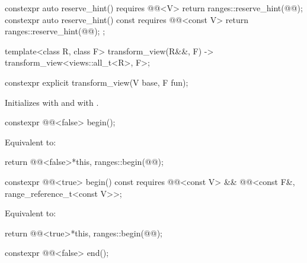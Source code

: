 \begin{codeblock}
{{    constexpr auto reserve_hint() requires @@<V>
    { return ranges::reserve_hint(@@); }
    constexpr auto reserve_hint() const requires @@<const V>
    { return ranges::reserve_hint(@@); }
  };

  template<class R, class F>
    transform_view(R&&, F) -> transform_view<views::all_t<R>, F>;
}
\end{codeblock}

%
\begin{itemdecl}
constexpr explicit transform_view(V base, F fun);
\end{itemdecl}

\begin{itemdescr}
\pnum
\effects
Initializes  with  and
 with .
\end{itemdescr}

%
\begin{itemdecl}
constexpr @@<false> begin();
\end{itemdecl}

\begin{itemdescr}
\pnum
\effects
Equivalent to:
\begin{codeblock}
return @@<false>{*this, ranges::begin(@@)};
\end{codeblock}
\end{itemdescr}

%
\begin{itemdecl}
constexpr @@<true> begin() const
  requires @@<const V> &&
           @@<const F&, range_reference_t<const V>>;
\end{itemdecl}

\begin{itemdescr}
\pnum
\effects
Equivalent to:
\begin{codeblock}
return @@<true>{*this, ranges::begin(@@)};
\end{codeblock}
\end{itemdescr}

%
\begin{itemdecl}
constexpr @@<false> end();
\end{itemdecl}

